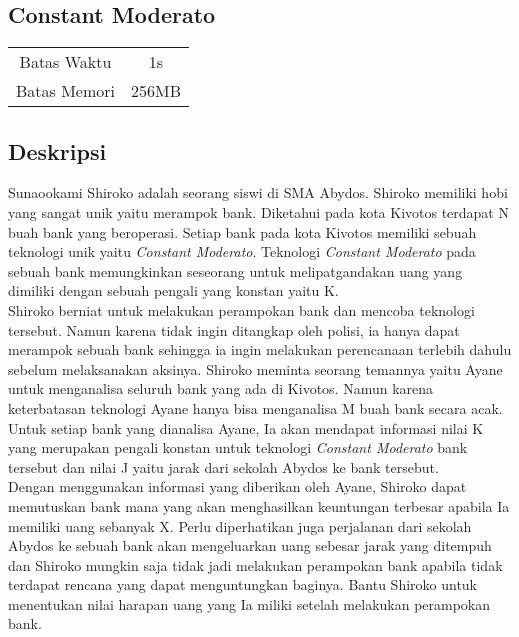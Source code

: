 \documentclass{article}
\begin{document}
\begin{center}

    
    \section*{Constant Moderato} %

    \begin{tabular}{ | c c | }
        \hline
        Batas Waktu  & 1s \\    %
        Batas Memori & 256MB \\  %
        \hline
    \end{tabular}
\end{center}

\subsection*{Deskripsi}

Sunaookami Shiroko adalah seorang siswi di SMA Abydos. Shiroko memiliki hobi yang sangat unik yaitu merampok bank. Diketahui pada kota Kivotos terdapat N buah bank yang beroperasi. Setiap bank pada kota Kivotos memiliki sebuah teknologi unik yaitu \emph{Constant Moderato}. Teknologi \emph{Constant Moderato} pada sebuah bank memungkinkan seseorang untuk melipatgandakan uang yang dimiliki dengan sebuah pengali yang konstan yaitu K.\\

Shiroko berniat untuk melakukan perampokan bank dan mencoba teknologi tersebut. Namun karena tidak ingin ditangkap oleh polisi, ia hanya dapat merampok sebuah bank sehingga ia ingin melakukan perencanaan terlebih dahulu sebelum melaksanakan aksinya. Shiroko meminta seorang temannya yaitu Ayane untuk menganalisa seluruh bank yang ada di Kivotos. Namun karena keterbatasan teknologi Ayane hanya bisa menganalisa M buah bank secara acak. Untuk setiap bank yang dianalisa Ayane, Ia akan mendapat informasi nilai K yang merupakan pengali konstan untuk teknologi \emph{Constant Moderato} bank tersebut dan nilai J yaitu jarak dari sekolah Abydos ke bank tersebut.\\

Dengan menggunakan informasi yang diberikan oleh Ayane, Shiroko dapat memutuskan bank mana yang akan menghasilkan keuntungan terbesar apabila Ia memiliki uang sebanyak X. Perlu diperhatikan juga perjalanan dari sekolah Abydos ke sebuah bank akan mengeluarkan uang sebesar jarak yang ditempuh dan Shiroko mungkin saja tidak jadi melakukan perampokan bank apabila tidak terdapat rencana yang dapat menguntungkan baginya. Bantu Shiroko untuk menentukan nilai harapan uang yang Ia miliki setelah melakukan perampokan bank.\\
\end{document}
